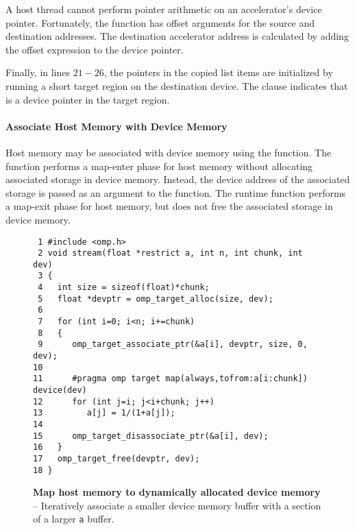 A host thread cannot perform pointer arithmetic on an accelerator's device
pointer.  Fortunately, the  function has offset
arguments for the source and destination addresses.  The destination
accelerator address is calculated by adding the  offset
expression to the  device pointer.

Finally, in lines $21-26$, the  pointers in the copied list items are
initialized by running a short target region on the destination device.  The
 clause indicates that  is a device pointer in the
target region.

\paragraph{Associate Host Memory with Device Memory}

Host memory may be associated with device memory using the  function.
The function performs a map-enter phase for host memory without allocating
associated storage in device memory.  Instead, the device address of the associated storage is passed
as an argument to the function.
The  runtime function
performs a map-exit phase for host memory, but does not free the associated
storage in device memory.  


\begin{figure*}[!tb]
\begin{verbatim}
 1 #include <omp.h>
 2 void stream(float *restrict a, int n, int chunk, int dev)
 3 {
 4   int size = sizeof(float)*chunk;
 5   float *devptr = omp_target_alloc(size, dev);
 6 
 7   for (int i=0; i<n; i+=chunk)
 8   {
 9      omp_target_associate_ptr(&a[i], devptr, size, 0, dev);
10 
11      #pragma omp target map(always,tofrom:a[i:chunk]) device(dev)
12      for (int j=i; j<i+chunk; j++)
13         a[j] = 1/(1+a[j]);
14 
15      omp_target_disassociate_ptr(&a[i], dev);
16   }
17   omp_target_free(devptr, dev);
18 }
\end{verbatim}
\caption{ \textbf {Map host memory to dynamically allocated device memory} -- \small
          Iteratively associate a smaller device memory buffer with a section
          of a larger \texttt{a} buffer.
         }
\label{figure:chapter6-assoc}
\end{figure*}

